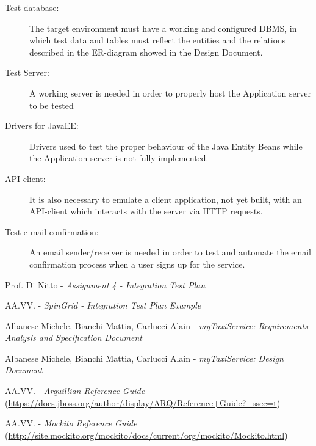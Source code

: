 \documentclass[a4paper, 12pt]{article}
\begin{document}
\begin{description}
    \item[Test database:] The target environment must have a working and configured DBMS, in which test data and tables must reflect the entities and the relations described in the ER-diagram showed in the Design Document.

    \item[Test Server:] A working server is needed in order to properly host the Application server to be tested

    \item[Drivers for JavaEE:] Drivers used to test the proper behaviour of the Java Entity Beans while the Application server is not fully implemented.

    \item[API client:] It is also necessary to emulate a client application, not yet built, with an API-client which interacts with the server via HTTP requests.

    \item[Test e-mail confirmation:] An email sender/receiver is needed in order to test and automate the email confirmation process when a user signs up for the service.
\end{description}

\appendix

\clearpage
{}

\begin{thebibliography}{9}
    Prof. Di Nitto - \emph{Assignment 4 - Integration Test Plan}

    AA.VV. - \emph{SpinGrid - Integration Test Plan Example}

        Albanese Michele, Bianchi Mattia, Carlucci Alain - \emph{myTaxiService: Requirements Analysis and Specification Document}

        Albanese Michele, Bianchi Mattia, Carlucci Alain - \emph{myTaxiService: Design Document}

        AA.VV. - \emph{Arquillian Reference Guide} {\small(\url{https://docs.jboss.org/author/display/ARQ/Reference+Guide?_sscc=t})}

        AA.VV. - \emph{Mockito Reference Guide} {\small(\url{http://site.mockito.org/mockito/docs/current/org/mockito/Mockito.html})}
\end{thebibliography}

\vfill

\end{document}

